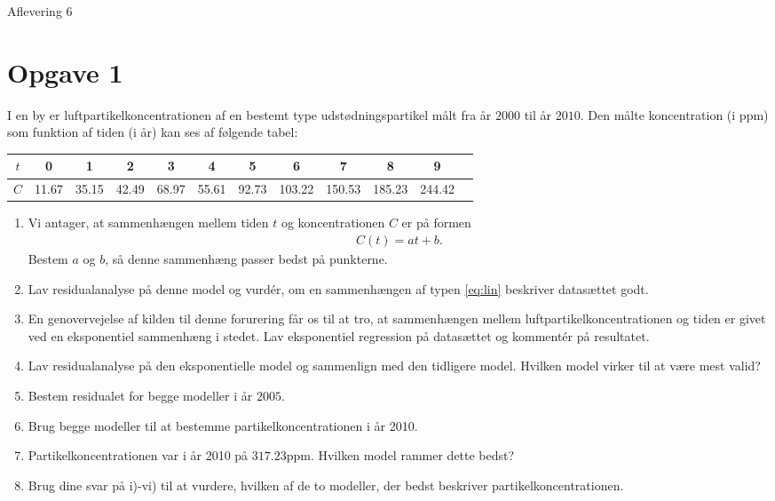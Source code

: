 
\begin{center}
\Huge
Aflevering 6
\end{center}
\section*{Opgave 1}

I en by er luftpartikelkoncentrationen af en bestemt type udstødningspartikel målt fra år $2000$ til år $2010$. Den målte koncentration (i ppm) som funktion af tiden (i år) kan ses af følgende tabel:
\begin{center}
\begin{tabular}{c|c|c|c|c|c|c|c|c|c|c|c}
$t$  & 0 & 1 & 2 & 3 & 4 & 5 & 6 & 7 & 8 & 9  \\
\hline
$C$  &11.67 & 35.15 & 42.49 & 68.97 & 55.61 & 92.73 & 103.22 & 150.53 & 185.23 & 244.42
\end{tabular}
\end{center}

\begin{enumerate}[label=\roman*)]
\item Vi antager, at sammenhængen mellem tiden $t$ og koncentrationen $C$ er på formen
\begin{align}\label{eq:lin}
C(t) = at+b.
\end{align}
Bestem $a$ og $b$, så denne sammenhæng passer bedst på punkterne. 
\item Lav residualanalyse på denne model og vurdér, om en sammenhængen af typen \eqref{eq:lin} beskriver datasættet godt.
\item En genovervejelse af kilden til denne forurering får os til at tro, at sammenhængen mellem luftpartikelkoncentrationen og tiden er givet ved en eksponentiel sammenhæng i stedet. Lav eksponentiel regression på datasættet og kommentér på resultatet.
\item Lav residualanalyse på den eksponentielle model og sammenlign med den tidligere model. Hvilken model virker til at være mest valid?
\item Bestem residualet for begge modeller i år $2005$.
\item Brug begge modeller til at bestemme partikelkoncentrationen i år 2010.
\item Partikelkoncentrationen var i år 2010 på $317.23$ppm. Hvilken model rammer dette bedst?
\item Brug dine svar på i)-vi) til at vurdere, hvilken af de to modeller, der bedst beskriver partikelkoncentrationen. 
\end{enumerate}



